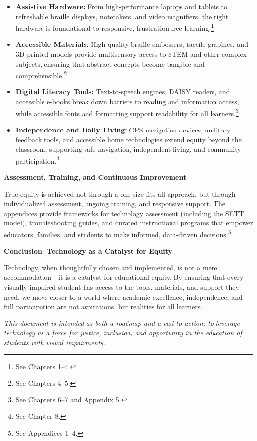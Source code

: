 \begin{itemize}
    \item \textbf{Assistive Hardware:} From high-performance laptops and tablets to refreshable braille displays, notetakers, and video magnifiers, the right hardware is foundational to responsive, frustration-free learning.\footnote{See Chapters 1–4.}
    \item \textbf{Accessible Materials:} High-quality braille embossers, tactile graphics, and 3D printed models provide multisensory access to STEM and other complex subjects, ensuring that abstract concepts become tangible and comprehensible.\footnote{See Chapters 4–5.}
    \item \textbf{Digital Literacy Tools:} Text-to-speech engines, DAISY readers, and accessible e-books break down barriers to reading and information access, while accessible fonts and formatting support readability for all learners.\footnote{See Chapters 6–7 and Appendix 5.}
    \item \textbf{Independence and Daily Living:} GPS navigation devices, auditory feedback tools, and accessible home technologies extend equity beyond the classroom, supporting safe navigation, independent living, and community participation.\footnote{See Chapter 8.}
\end{itemize}

\textbf{Assessment, Training, and Continuous Improvement}

True equity is achieved not through a one-size-fits-all approach, but through individualized assessment, ongoing training, and responsive support. The appendices provide frameworks for technology assessment (including the SETT model), troubleshooting guides, and curated instructional programs that empower educators, families, and students to make informed, data-driven decisions.\footnote{See Appendices 1–4.}

\textbf{Conclusion: Technology as a Catalyst for Equity}

Technology, when thoughtfully chosen and implemented, is not a mere accommodation—it is a catalyst for educational equity. By ensuring that every visually impaired student has access to the tools, materials, and support they need, we move closer to a world where academic excellence, independence, and full participation are not aspirations, but realities for all learners.

\bigskip

\noindent\textit{This document is intended as both a roadmap and a call to action: to leverage technology as a force for justice, inclusion, and opportunity in the education of students with visual impairments.}

